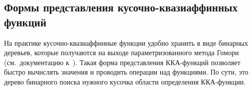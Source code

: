 \begin{multicols}{2}
\vspace*{-3pt}

\section{Формы представления кусочно-квазиаффинных функций}

На практике кусочно-квазиаффинные функции удобно хранить в виде
бинарных деревьев, которые получаются на выходе параметризованного
метода Гомори (см.\ документацию к~\cite{Feautrier3}). Такая форма
представления ККА-функ\-ций позволяет быст\-ро вычислять значения и
проводить операции над функциями. По сути, это дерево бинарного
поиска нужного кусочка области определения ККА-функ\-ции.

\begin{figure*} %
\vspace*{1pt}
 \begin{center}
 \mbox{%
 \epsfxsize=98.58mm
 }
 \end{center}
 \vspace*{-9pt}
\end{figure*}



\smallskip


\end{multicols}
